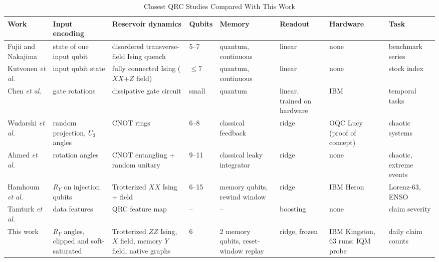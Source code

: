 \documentclass[journal]{IEEEtran}
\begin{document}
\begin{table}[t]
\centering
\caption{Closest QRC Studies Compared With This Work}
\label{tab:related}
\footnotesize
\setlength{\tabcolsep}{3.5pt}
\begin{tabular}{@{}p{2.3cm}p{2.4cm}p{2.9cm}p{1.1cm}p{2.1cm}p{1.8cm}p{2.0cm}p{1.7cm}@{}}
\toprule
Work & Input encoding & Reservoir dynamics & Qubits & Memory & Readout & Hardware & Task \\
\midrule
Fujii and Nakajima \cite{Fujii2017QRC} & state of one input qubit & disordered transverse-field Ising quench & 5--7 & quantum, continuous & linear & none & benchmark series \\
Kutvonen \emph{et al.} \cite{Kutvonen2020Optimizing} & input qubit state & fully connected Ising ($XX$+$Z$ field) & $\le 7$ & quantum, continuous & linear & none & stock index \\
Chen \emph{et al.} \cite{Chen2020Noisy} & gate rotations & dissipative gate circuit & small & quantum & linear, trained on hardware & IBM & temporal tasks \\
Wudarski \emph{et al.} \cite{Wudarski2023Hybrid} & random projection, $U_3$ angles & CNOT rings & 6--8 & classical feedback & ridge & OQC Lucy (proof of concept) & chaotic systems \\
Ahmed \emph{et al.} \cite{Ahmed2024RecurrenceFree} & rotation angles & CNOT entangling + random unitary & 9--11 & classical leaky integrator & ridge & none & chaotic, extreme events \\
Hamhoum \emph{et al.} \cite{Hamhoum2025Multivariate} & $R_Y$ on injection qubits & Trotterized $XX$ Ising + field & 6--15 & memory qubits, rewind window & ridge & IBM Heron & Lorenz-63, ENSO \\
Tamturk \emph{et al.} \cite{Tamturk2026Insurance} & data features & QRC feature map & -- & -- & boosting & none & claim severity \\
This work & $R_Y$ angles, clipped and soft-saturated & Trotterized $ZZ$ Ising, $X$ field, memory $Y$ field, native graphs & 6 & 2 memory qubits, reset-window replay & ridge, frozen & IBM Kingston, 63 runs; IQM probe & daily claim counts \\
\bottomrule
\end{tabular}
\end{table}
\end{document}
